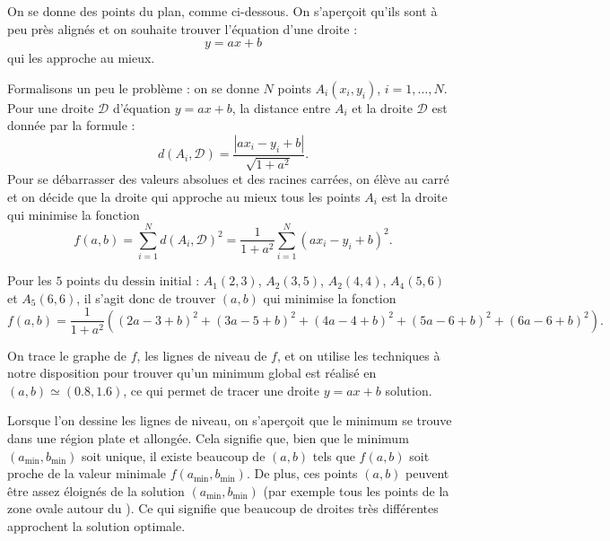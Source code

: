 \begin{exemple}{}{}
	On se donne des points du plan, comme ci-dessous. On s'aperçoit qu'ils sont à peu près alignés et on souhaite trouver l'équation d'une droite :
	$$y= a x + b$$ 
	qui les approche au mieux.
	
	
	
	
	Formalisons un peu le problème : on se donne $N$ points $A_i(x_i,y_i)$, $i=1,\ldots,N$. Pour une droite $\mathcal{D}$ d'équation $y=ax+b$, la distance entre $A_i$ et la droite $\mathcal{D}$ est donnée par la formule :
	$$d(A_i,\mathcal{D}) = \frac{|ax_i-y_i+b|}{\sqrt{1+a^2}}.$$
	Pour se débarrasser des valeurs absolues et des racines carrées, on élève au carré et on décide que la droite qui approche au mieux tous les points $A_i$ est la droite qui minimise la fonction 
	$$f(a,b) = \sum_{i=1}^{N} d(A_i,\mathcal{D})^2 = 
	\frac{1}{1+a^2} \sum_{i=1}^{N}  (ax_i-y_i+b)^2.$$
	
	Pour les $5$ points du dessin initial : $A_1(2,3)$, $A_2(3,5)$, 
	$A_2(4,4)$, $A_4(5,6)$ et $A_5(6,6)$, il s'agit donc de trouver $(a,b)$ qui minimise la fonction 
	$$f(a,b) = \frac{1}{1+a^2} \left( 
	(2a-3+b)^2 + (3a-5+b)^2 + (4a-4+b)^2 + (5a-6+b)^2 + (6a-6+b)^2 \right).$$
	
	
	On trace le graphe de $f$, les lignes de niveau de $f$, et on utilise les techniques à notre disposition pour trouver qu'un minimum global est réalisé en $(a,b) \simeq (0.8,1.6)$, ce qui permet de tracer une droite $y=ax+b$ solution.
	
	
	Lorsque l'on dessine les lignes de niveau, on s'aperçoit que le minimum se trouve dans une région plate et allongée. Cela signifie que, bien que le minimum $(a_{\min},b_{\min})$ soit unique, il existe beaucoup de $(a,b)$ tels que $f(a,b)$ soit proche de la valeur minimale $f(a_{\min},b_{\min})$. De plus, ces points $(a,b)$ peuvent être assez éloignés de la solution $(a_{\min},b_{\min})$ (par exemple tous les points de la zone ovale autour du ). Ce qui signifie que beaucoup de droites très différentes approchent la solution optimale.
	

\end{exemple}
